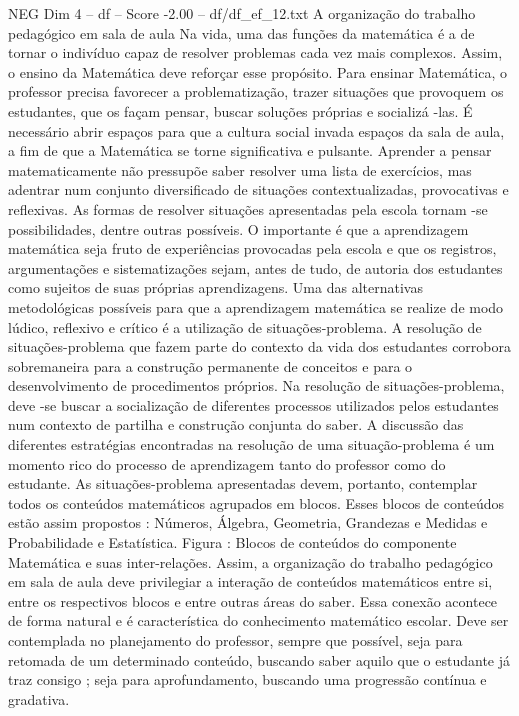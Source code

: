 \begin{textsample}{NEG Dim 4 – df – Score -2.00 – df/df\_ef\_12.txt}  \label{ex:f4_neg_062}
A organização do trabalho pedagógico em sala de aula Na vida, uma das funções da matemática é a de tornar o indivíduo capaz de resolver problemas cada vez mais complexos.
Assim, o ensino da Matemática deve reforçar esse propósito.
Para ensinar Matemática, o professor precisa favorecer a problematização, trazer situações que provoquem os estudantes, que os façam pensar, buscar soluções próprias e socializá -las.
É necessário abrir espaços para que a cultura social invada espaços da sala de aula, a fim de que a Matemática se torne significativa e pulsante.
Aprender a pensar matematicamente não pressupõe saber resolver uma lista de exercícios, mas adentrar num conjunto diversificado de situações contextualizadas, provocativas e reflexivas.
As formas de resolver situações apresentadas pela escola tornam -se possibilidades, dentre outras possíveis.
O importante é que a aprendizagem matemática seja fruto de experiências provocadas pela escola e que os registros, argumentações e sistematizações sejam, antes de tudo, de autoria dos estudantes como sujeitos de suas próprias aprendizagens.
Uma das alternativas metodológicas possíveis para que a aprendizagem matemática se realize de modo lúdico, reflexivo e crítico é a utilização de situações-problema.
A resolução de situações-problema que fazem parte do contexto da vida dos estudantes corrobora sobremaneira para a construção permanente de conceitos e para o desenvolvimento de procedimentos próprios.
Na resolução de situações-problema, deve -se buscar a socialização de diferentes processos utilizados pelos estudantes num contexto de partilha e construção conjunta do saber.
A discussão das diferentes estratégias encontradas na resolução de uma situação-problema é um momento rico do processo de aprendizagem tanto do professor como do estudante.
As situações-problema apresentadas devem, portanto, contemplar todos os conteúdos matemáticos agrupados em blocos.
Esses blocos de conteúdos estão assim propostos : Números, Álgebra, Geometria, Grandezas e Medidas e Probabilidade e Estatística.
Figura : Blocos de conteúdos do componente Matemática e suas inter-relações.
Assim, a organização do trabalho pedagógico em sala de aula deve privilegiar a interação de conteúdos matemáticos entre si, entre os respectivos blocos e entre outras áreas do saber.
Essa conexão acontece de forma natural e é característica do conhecimento matemático escolar.
Deve ser contemplada no planejamento do professor, sempre que possível, seja para retomada de um determinado conteúdo, buscando saber aquilo que o estudante já traz consigo ; seja para aprofundamento, buscando uma progressão contínua e gradativa.

\end{textsample}
